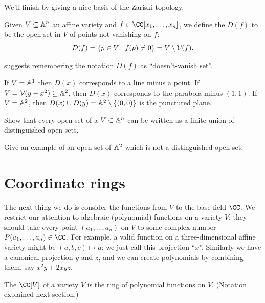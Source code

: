 \documentclass[11pt]{scrreprt}
\begin{document}
We'll finish by giving a nice basis of the Zariski topology.
\begin{definition}
	Given $V \subseteq \mathbb A^n$ an affine variety and $f \in \CC[x_1, \dots, x_n]$,
	we define the  $D(f)$ to be the open set in $V$
	of points not vanishing on $f$:
	\[ D(f) = \left\{ p \in V \mid f(p) \neq 0 \right\} = V \setminus \mathcal V(f). \]
\end{definition}
\cite{ref:vakil} suggests remembering the notation $D(f)$ as ``doesn't-vanish set''.
\begin{example}
	\listhack
	\begin{enumerate}[(a)]
		\ii If $V = \mathbb A^1$ then $D(x)$ corresponds to a line minus a point.
		\ii If $V = \mathcal V(y-x^2) \subseteq \mathbb A^2$,
		then $D(x)$ corresponds to the parabola minus $(1,1)$.
		\ii If $V = \mathbb A^2$, then $D(x) \cup D(y) = \mathbb A^2 \setminus \{ (0,0) \}$ is the punctured plane.
	\end{enumerate}
\end{example}
\begin{ques}
	Show that every open set of a $V \subset \mathbb A^n$
	can be written as a finite union of distinguished open sets.
\end{ques}
\begin{exercise}
	Give an example of an open set of $\mathbb A^2$ which is not a distinguished open set.
\end{exercise}

\section{Coordinate rings}

The next thing we do is consider the functions from $V$ to the base field $\CC$.
We restrict our attention to algebraic (polynomial) functions on a variety $V$:
they should take every point $(a_1, \dots, a_n)$ on $V$ to some complex number $P(a_1, \dots, a_n) \in \CC$.
For example, a valid function on a three-dimensional affine variety might be $(a,b,c) \mapsto a$;
we just call this projection ``$x$''.
Similarly we have a canonical projection $y$ and $z$,
and we can create polynomials by combining them,
say $x^2y + 2xyz$.

\begin{definition}
	The  $\CC[V]$ of a variety $V$
	is the ring of polynomial functions on $V$.
	(Notation explained next section.)
\end{definition}
\end{document}
